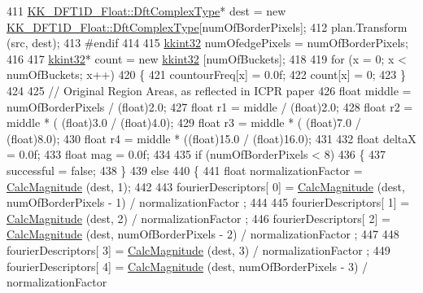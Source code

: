 \begin{DoxyCode}
411     \hyperlink{class_k_k_b_1_1_k_k___d_f_t1_d_a4cbc827157dd30ddec2d3753e552a827}{KK\_DFT1D\_Float::DftComplexType}*  dest = \textcolor{keyword}{new} 
      \hyperlink{class_k_k_b_1_1_k_k___d_f_t1_d_a4cbc827157dd30ddec2d3753e552a827}{KK\_DFT1D\_Float::DftComplexType}[numOfBorderPixels];
412     plan.Transform (src, dest);
413 \textcolor{preprocessor}{  #endif}
414 
415   \hyperlink{namespace_k_k_b_a8fa4952cc84fda1de4bec1fbdd8d5b1b}{kkint32}  numOfedgePixels = numOfBorderPixels;
416 
417   \hyperlink{namespace_k_k_b_a8fa4952cc84fda1de4bec1fbdd8d5b1b}{kkint32}*  count = \textcolor{keyword}{new} \hyperlink{namespace_k_k_b_a8fa4952cc84fda1de4bec1fbdd8d5b1b}{kkint32} [numOfBuckets];
418 
419   \textcolor{keywordflow}{for}  (x = 0;  x < numOfBuckets;  x++)
420   \{
421     countourFreq[x] = 0.0f;
422     count[x] = 0;
423   \}
424 
425   \textcolor{comment}{// Original Region Areas,  as reflected in ICPR paper}
426   \textcolor{keywordtype}{float}  middle = numOfBorderPixels / (float)2.0;
427   \textcolor{keywordtype}{float}  r1 = middle / (float)2.0;
428   \textcolor{keywordtype}{float}  r2 = middle * ( (float)3.0  /   (\textcolor{keywordtype}{float})4.0);
429   \textcolor{keywordtype}{float}  r3 = middle * ( (float)7.0  /   (\textcolor{keywordtype}{float})8.0);
430   \textcolor{keywordtype}{float}  r4 = middle * ((float)15.0  /  (\textcolor{keywordtype}{float})16.0);
431 
432   \textcolor{keywordtype}{float}  deltaX = 0.0f;
433   \textcolor{keywordtype}{float}  mag    = 0.0f;
434 
435   \textcolor{keywordflow}{if}  (numOfBorderPixels < 8)
436   \{
437     successful = \textcolor{keyword}{false};
438   \}
439   \textcolor{keywordflow}{else}
440   \{
441     \textcolor{keywordtype}{float} normalizationFactor = \hyperlink{_contour_follower_8cpp_a439a52b08a2ee8bb055946b53bbeb2d3}{CalcMagnitude} (dest, 1);
442 
443     fourierDescriptors[ 0] = \hyperlink{_contour_follower_8cpp_a439a52b08a2ee8bb055946b53bbeb2d3}{CalcMagnitude} (dest, numOfBorderPixels - 1) / normalizationFactor
      ;
444 
445     fourierDescriptors[ 1] = \hyperlink{_contour_follower_8cpp_a439a52b08a2ee8bb055946b53bbeb2d3}{CalcMagnitude} (dest, 2)                     / normalizationFactor
      ;
446     fourierDescriptors[ 2] = \hyperlink{_contour_follower_8cpp_a439a52b08a2ee8bb055946b53bbeb2d3}{CalcMagnitude} (dest, numOfBorderPixels - 2) / normalizationFactor
      ;
447 
448     fourierDescriptors[ 3] = \hyperlink{_contour_follower_8cpp_a439a52b08a2ee8bb055946b53bbeb2d3}{CalcMagnitude} (dest, 3)                     / normalizationFactor
      ;
449     fourierDescriptors[ 4] = \hyperlink{_contour_follower_8cpp_a439a52b08a2ee8bb055946b53bbeb2d3}{CalcMagnitude} (dest, numOfBorderPixels - 3) / normalizationFactor

\end{DoxyCode}
